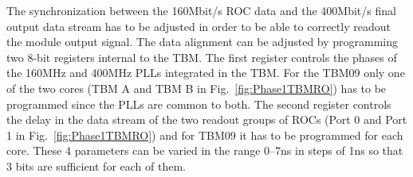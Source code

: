 The synchronization between the 160\unit{Mbit/s} ROC data and the 400\unit{Mbit/s} final output data stream has to be adjusted in order to be able to correctly readout the module output signal.
The data alignment can be adjusted by programming two 8-bit registers internal to the TBM.
The first register controls the phases of the 160\unit{MHz} and 400\unit{MHz} PLLs integrated in the TBM.
For the TBM09 only one of the two cores (TBM A and TBM B in Fig.~\ref{fig:Phase1TBMRO}) has to be programmed since the PLLs are common to both.
The second register controls the delay in the data stream of the two readout groups of ROCs (Port 0 and Port 1 in Fig.~\ref{fig:Phase1TBMRO}) and for TBM09 it has to be programmed for each core.
These 4 parameters can be varied in the range 0--7\unit{ns} in steps of 1\unit{ns} so that 3 bits are sufficient for each of them.

